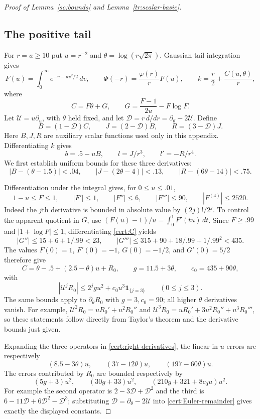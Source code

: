 \documentclass[11pt]{article}
\theoremstyle{definition}
\theoremstyle{remark}
\numberwithin{equation}{section}
\begin{document}
\begin{proof}[Proof of Lemma~\ref{sc:bounds} and Lemma~\ref{tr:scalar-basic}]
\subsection*{The positive tail}
For $r=a\ge10$ put $u=r^{-2}$ and
$\theta=\log(r\sqrt{2\pi})$. Gaussian tail integration gives
\[
 F(u)=\int_0^\infty e^{-v-uv^2/2}\,dv,\qquad
 \Phi(-r)=\frac{\varphi(r)}r F(u),\qquad
 k=\frac r2+\frac{C(u,\theta)}r,
\]
where
\begin{equation}\label{cert:C}
 C=F\theta+G,\qquad
 G=\frac{F-1}{2u}-F\log F.
\end{equation}
Let $\mathcal U=u\partial_u$, with $\theta$ held fixed, and let
$\mathcal D=r\,d/dr=\partial_\theta-2\mathcal U$. Define
\[
 B=(1-\mathcal D)C,\qquad J=(2-\mathcal D)B,\qquad
 R=(3-\mathcal D)J.
\]
Here $B,J,R$ are auxiliary scalar functions used only in this appendix.
Differentiating $k$ gives
\begin{equation}\label{cert:right-derivatives}
 b=.5-uB,\qquad l=J/r^3,\qquad l'=-R/r^4.
\end{equation}
We first establish uniform bounds for these three derivatives:
\begin{equation}\label{cert:right-errors}
 |B-(\theta-1.5)|<.04,\qquad
 |J-(2\theta-4)|<.13,\qquad
 |R-(6\theta-14)|<.75.
\end{equation}

Differentiation under the integral gives, for $0\le u\le.01$,
\[
 1-u\le F\le1,\qquad |F'|\le1,\qquad
 |F''|\le6,\qquad |F'''|\le90,\qquad |F^{(4)}|\le2520.
\]
Indeed the $j$th derivative is bounded in absolute value by
$(2j)!/2^j$. To control the apparent quotient in $G$, use
$(F(u)-1)/u=\int_0^1F'(tu)\,dt$. Since $F\ge.99$ and
$|1+\log F|\le1$, differentiating \eqref{cert:C} yields
\[
 |G''|\le15+6+1/.99<23,\qquad
 |G'''|\le315+90+18/.99+1/.99^2<435.
\]
The values $F(0)=1$, $F'(0)=-1$, $G(0)=-1/2$, and $G'(0)=5/2$
therefore give
\[
 C=\theta-.5+(2.5-\theta)u+R_0,\qquad
 g=11.5+3\theta,\qquad c_0=435+90\theta,
\]
with
\begin{equation}\label{cert:Euler-remainder}
 |\mathcal U^jR_0|\le2^jg u^2+c_0u^3\mathbf1_{\{j=3\}}
       \qquad(0\le j\le3).
\end{equation}
The same bounds apply to $\partial_\theta R_0$ with $g=3,c_0=90$;
all higher $\theta$ derivatives vanish. For example,
$\mathcal U^2R_0=uR_0'+u^2R_0''$ and
$\mathcal U^3R_0=uR_0'+3u^2R_0''+u^3R_0'''$, so these statements
follow directly from Taylor's theorem and the derivative bounds just given.

Expanding the three operators in \eqref{cert:right-derivatives}, the
linear-in-$u$ errors are respectively
\[
 (8.5-3\theta)u,\qquad (37-12\theta)u,\qquad
 (197-60\theta)u.
\]
The errors contributed by $R_0$ are bounded respectively by
\begin{equation}\label{cert:operator-errors}
 (5g+3)u^2,\qquad(30g+33)u^2,\qquad
 (210g+321+8c_0u)u^2.
\end{equation}
For example the second operator is
$2-3\mathcal D+\mathcal D^2$ and the third is
$6-11\mathcal D+6\mathcal D^2-\mathcal D^3$; substituting
$\mathcal D=\partial_\theta-2\mathcal U$ into
\eqref{cert:Euler-remainder} gives exactly the displayed constants.


\end{proof}
\end{document}
